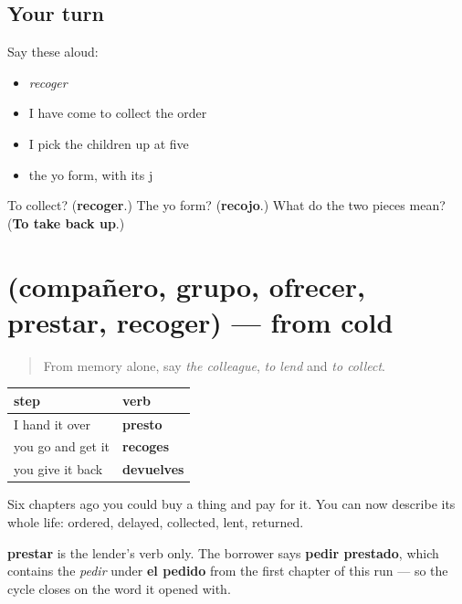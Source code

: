 \subsection*{Your turn}
Say these aloud:

\begin{itemize}
\raggedright
  \item \emph{recoger}
  \item I have come to collect the order
  \item I pick the children up at five
  \item the yo form, with its j
\end{itemize}

\begin{tcolorbox}[breakable,colback=teal!4,colframe=teal!35!black,title={Before you move on}]
To collect? (\textbf{recoger}.) The yo form? (\textbf{recojo}.) What do the two pieces mean? (\textbf{To take back up}.)
\end{tcolorbox}
\section[(compañero, grupo, ofrecer, prestar …]{(compañero, grupo, ofrecer, prestar, recoger) — from cold}

\label{lesson:ES-R436-repaso-gente}



\begin{quote}
From memory alone, say \emph{the colleague}, \emph{to lend} and \emph{to collect}.
\end{quote}

\begin{grammarlens}[title={Grammar Lens: the cycle is now complete}]
\noindent
\begin{tabularx}{\linewidth}{@{}>{\raggedright\arraybackslash}X>{\raggedright\arraybackslash}X@{}}
\toprule
\textbf{step} & \textbf{verb} \\
\midrule
I hand it over & \textbf{presto} \\
you go and get it & \textbf{recoges} \\
you give it back & \textbf{devuelves} \\
\bottomrule
\end{tabularx}

Six chapters ago you could buy a thing and pay for it. You can now describe its whole life: ordered, delayed, collected, lent, returned.

\textbf{prestar} is the lender's verb only. The borrower says \textbf{pedir prestado}, which contains the \emph{pedir} under \textbf{el pedido} from the first chapter of this run — so the cycle closes on the word it opened with.
\end{grammarlens}

